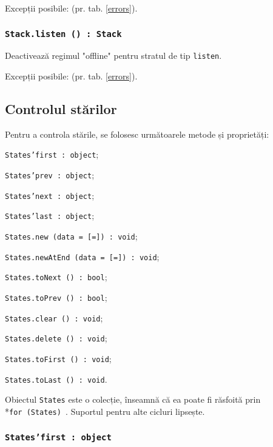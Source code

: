Excepții posibile:  (pr. tab. \ref{errors}).

\subsubsection{\texttt{Stack.listen () : Stack}}

Deactivează regimul "offline" pentru stratul de tip \texttt{listen}.

Excepții posibile:  (pr. tab. \ref{errors}).

\subsection{Controlul stărilor}

Pentru a controla stările, se folosesc următoarele metode și proprietăți:
\begin{icItems}
	\item \texttt{States'first : object};
	\item \texttt{States'prev : object};
	\item \texttt{States'next : object};
	\item \texttt{States'last : object};
	\item \texttt{States.new (data = [=]) : void};
	\item \texttt{States.newAtEnd (data = [=]) : void};
	\item \texttt{States.toNext () : bool};
	\item \texttt{States.toPrev () : bool};
	\item \texttt{States.clear () : void};
	\item \texttt{States.delete () : void};
	\item \texttt{States.toFirst () : void};
	\item \texttt{States.toLast () : void}.
\end{icItems}

Obiectul \texttt{States} este o colecție, înseamnă că ea poate fi răsfoită prin \\*\texttt{for (States) {}}. Suportul pentru alte cicluri lipsește.

\subsubsection{\texttt{States'first : object}}

